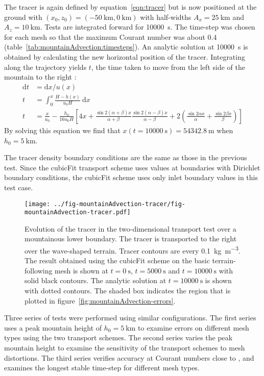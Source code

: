The tracer is again defined by equation~\eqref{eqn:tracer} but is now positioned at the ground with $(x_0, z_0) = (\SI{-50}{\kilo\meter}, \SI{0}{\kilo\meter})$ with half-widths $A_x = \SI{25}{\kilo\meter}$ and $A_z = \SI{10}{\kilo\meter}$.
Tests are integrated forward for \SI{10000}{\second}.  The time-step was chosen for each mesh so that the maximum Courant number was about \num{0.4} (table~\ref{tab:mountainAdvection:timesteps}).
An analytic solution at \SI{10000}{\second} is obtained by calculating the new horizontal position of the tracer.  Integrating along the trajectory yields $t$, the time taken to move from the left side of the mountain to the right \citep{shaw-weller2016}:
\begin{align}
	\mathrm{d}t &= \mathrm{d}x / u(x) \\
	t &= \int_0^x \frac{H - h(x)}{u_0 H}\:\mathrm{d}x \\
	t &= \frac{x}{u_0} - \frac{h_0}{16 u_0 H} \left[ 4x + \frac{\sin 2 (\alpha + \beta) x}{\alpha + \beta} 
 \frac{\sin 2(\alpha - \beta) x}{\alpha - \beta} + 2 \left( \frac{\sin 2\alpha x}{\alpha} + \frac{\sin 2\beta x}{\beta} \right) \right]
\end{align}
By solving this equation we find that \(x(t=\SI{10000}{\second}) = \SI{54342.8}{\meter}\) when $h_0 = \SI{5}{\kilo\meter}$.

The tracer density boundary conditions are the same as those in the previous test.
Since the cubicFit transport scheme uses values at boundaries with Dirichlet boundary conditions, the cubicFit scheme uses only inlet boundary values in this test case.

\begin{figure}
	\centering
	\texttt{[image: ../fig-mountainAdvection-tracer/fig-mountainAdvection-tracer.pdf]}
	\caption{Evolution of the tracer in the two-dimensional transport test over a mountainous lower boundary.  The tracer is transported to the right over the wave-shaped terrain.  Tracer contours are every \SI{0.1}{\kilo\gram\per\meter\cubed}.  The result obtained using the cubicFit scheme on the basic terrain-following mesh is shown at $t=\SI{0}{\second}$, $t=\SI{5000}{\second}$ and $t=\SI{10000}{\second}$ with solid black contours. The analytic solution at $t=\SI{10000}{\second}$ is shown with dotted contours.
	The shaded box indicates the region that is plotted in figure~\ref{fig:mountainAdvection-errors}.}
	\label{fig:mountainAdvection-tracer}
\end{figure}

Three series of tests were performed using similar configurations.  The first series uses a peak mountain height of $h_0 = \SI{5}{\kilo\meter}$ to examine errors on different mesh types using the two transport schemes.
The second series varies the peak mountain height to examine the sensitivity of the transport schemes to mesh distortions.
The third series verifies accuracy at Courant numbers close to , and examines the longest stable time-step for different mesh types.

